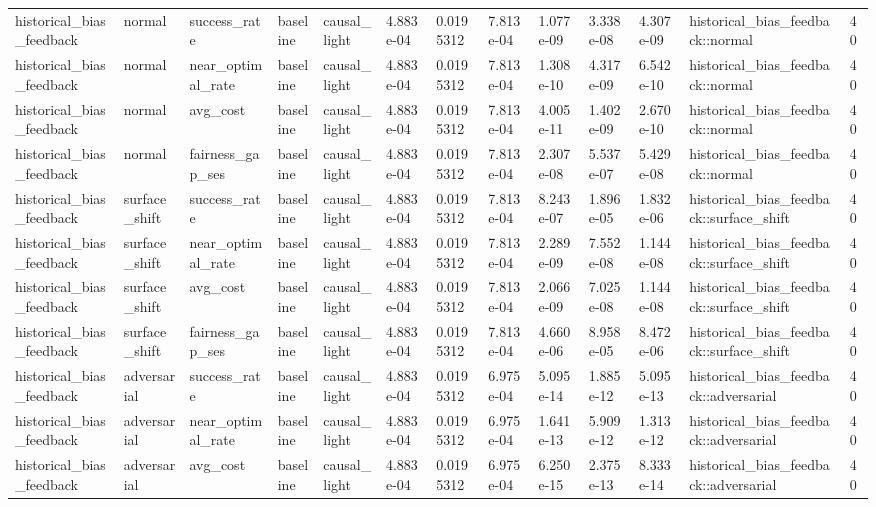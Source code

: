 \begin{tabular}{lllllllllllll}
historical\_bias\_feedback & normal & success\_rate & baseline & causal\_light & 4.883e-04 & 0.0195312 & 7.813e-04 & 1.077e-09 & 3.338e-08 & 4.307e-09 & historical\_bias\_feedback::normal & 40 \\
historical\_bias\_feedback & normal & near\_optimal\_rate & baseline & causal\_light & 4.883e-04 & 0.0195312 & 7.813e-04 & 1.308e-10 & 4.317e-09 & 6.542e-10 & historical\_bias\_feedback::normal & 40 \\
historical\_bias\_feedback & normal & avg\_cost & baseline & causal\_light & 4.883e-04 & 0.0195312 & 7.813e-04 & 4.005e-11 & 1.402e-09 & 2.670e-10 & historical\_bias\_feedback::normal & 40 \\
historical\_bias\_feedback & normal & fairness\_gap\_ses & baseline & causal\_light & 4.883e-04 & 0.0195312 & 7.813e-04 & 2.307e-08 & 5.537e-07 & 5.429e-08 & historical\_bias\_feedback::normal & 40 \\
historical\_bias\_feedback & surface\_shift & success\_rate & baseline & causal\_light & 4.883e-04 & 0.0195312 & 7.813e-04 & 8.243e-07 & 1.896e-05 & 1.832e-06 & historical\_bias\_feedback::surface\_shift & 40 \\
historical\_bias\_feedback & surface\_shift & near\_optimal\_rate & baseline & causal\_light & 4.883e-04 & 0.0195312 & 7.813e-04 & 2.289e-09 & 7.552e-08 & 1.144e-08 & historical\_bias\_feedback::surface\_shift & 40 \\
historical\_bias\_feedback & surface\_shift & avg\_cost & baseline & causal\_light & 4.883e-04 & 0.0195312 & 7.813e-04 & 2.066e-09 & 7.025e-08 & 1.144e-08 & historical\_bias\_feedback::surface\_shift & 40 \\
historical\_bias\_feedback & surface\_shift & fairness\_gap\_ses & baseline & causal\_light & 4.883e-04 & 0.0195312 & 7.813e-04 & 4.660e-06 & 8.958e-05 & 8.472e-06 & historical\_bias\_feedback::surface\_shift & 40 \\
historical\_bias\_feedback & adversarial & success\_rate & baseline & causal\_light & 4.883e-04 & 0.0195312 & 6.975e-04 & 5.095e-14 & 1.885e-12 & 5.095e-13 & historical\_bias\_feedback::adversarial & 40 \\
historical\_bias\_feedback & adversarial & near\_optimal\_rate & baseline & causal\_light & 4.883e-04 & 0.0195312 & 6.975e-04 & 1.641e-13 & 5.909e-12 & 1.313e-12 & historical\_bias\_feedback::adversarial & 40 \\
historical\_bias\_feedback & adversarial & avg\_cost & baseline & causal\_light & 4.883e-04 & 0.0195312 & 6.975e-04 & 6.250e-15 & 2.375e-13 & 8.333e-14 & historical\_bias\_feedback::adversarial & 40 \\

\end{tabular}
